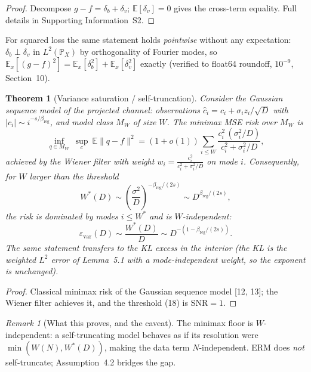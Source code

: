 \documentclass[12pt]{article}
\newcommand{\eps}{\varepsilon}
\newcommand{\E}{\mathbb{E}}
\newcommand{\Prob}{\mathbb{P}}
\newtheorem{theorem}{Theorem}[section]
\theoremstyle{remark}
\newtheorem{remark}{Remark}
\begin{document}
\begin{proof}
Decompose $g-f=\delta_b+\delta_v$; $\E[\delta_v]=0$ gives the cross-term
equality. Full details in Supporting Information~S2.
\end{proof}

For squared loss the same statement holds \emph{pointwise} without any
expectation: $\delta_b\perp\delta_v$ in $L^2(\Prob_X)$ by orthogonality of
Fourier modes, so $\E_x[(g-f)^2]=\E_x[\delta_b^2]+\E_x[\delta_v^2]$ exactly
(verified to float64 roundoff, $10^{-9}$, Section~10).

\begin{theorem}[Variance saturation / self-truncation]
\label{thm:saturation}
Consider the Gaussian sequence model of the projected channel:
observations $\hat c_i=c_i+\sigma_i z_i/\sqrt{D}$ with $|c_i|\sim
i^{-s/\beta_{\mathrm{reg}}}$, and model class $M_W$ of size $W$. The minimax MSE
risk over $M_W$ is
\begin{equation}
  \inf_{q\in M_W}\ \sup_{c}\ \E\|q-f\|^2
  = (1+o(1))\sum_{i\le W}
  \frac{c_i^2\,(\sigma_i^2/D)}{c_i^2+\sigma_i^2/D},
  \label{eq:minimax}
\end{equation}
achieved by the Wiener filter with weight $w_i=
\frac{c_i^2}{c_i^2+\sigma_i^2/D}$ on mode $i$. Consequently, for $W$ larger
than the threshold
\begin{equation}
  W^*(D)\sim \left(\frac{\sigma^2}{D}\right)^{-\beta_{\mathrm{reg}}/(2s)}
  \sim D^{\beta_{\mathrm{reg}}/(2s)},
  \label{eq:Wstar}
\end{equation}
the risk is dominated by modes $i\le W^*$ and is $W$-independent:
\begin{equation}
  \eps_{\mathrm{var}}(D)\sim \frac{W^*(D)}{D}\sim
  D^{-(1-\beta_{\mathrm{reg}}/(2s))}.
  \label{eq:varstar}
\end{equation}
The same statement transfers to the KL excess in the interior (the KL is the
weighted $L^2$ error of Lemma~5.1 with a mode-independent
weight, so the exponent is unchanged).
\end{theorem}

\begin{proof}
Classical minimax risk of the Gaussian sequence model
[12, 13]; the Wiener filter achieves it, and the
threshold (18) is SNR$=1$.
\end{proof}

\begin{remark}[What this proves, and the caveat]
\label{rem:realizability}
The minimax floor is $W$-independent: a self-truncating model behaves as if its
resolution were $\min(W(N),W^*(D))$, making the data term $N$-independent.
ERM does \emph{not} self-truncate; Assumption~4.2 bridges the gap.
\end{remark}
\end{document}
